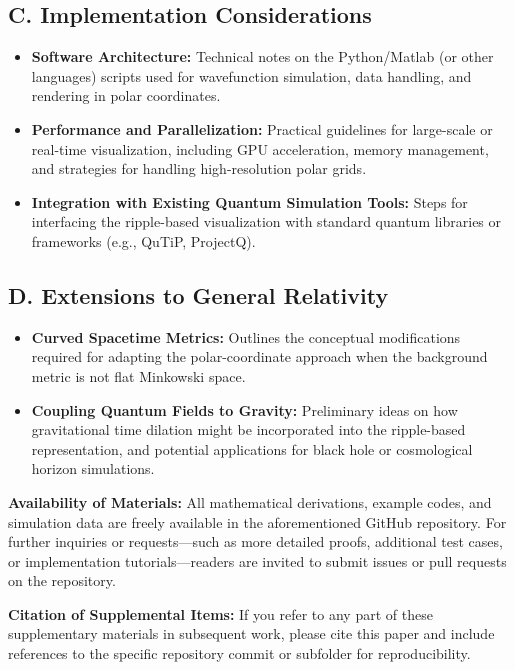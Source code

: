 \documentclass{article}
\begin{document}
\subsection*{C. Implementation Considerations}
\begin{itemize}
    \item \textbf{Software Architecture:}
    Technical notes on the Python/Matlab (or other languages) scripts used for wavefunction simulation, data handling, and rendering in polar coordinates.
    \item \textbf{Performance and Parallelization:}
    Practical guidelines for large-scale or real-time visualization, including GPU acceleration, memory management, and strategies for handling high-resolution polar grids.
    \item \textbf{Integration with Existing Quantum Simulation Tools:}
    Steps for interfacing the ripple-based visualization with standard quantum libraries or frameworks (e.g., QuTiP, ProjectQ). 
\end{itemize}

\subsection*{D. Extensions to General Relativity}
\begin{itemize}
    \item \textbf{Curved Spacetime Metrics:}
    Outlines the conceptual modifications required for adapting the polar-coordinate approach when the background metric is not flat Minkowski space. 
    \item \textbf{Coupling Quantum Fields to Gravity:}
    Preliminary ideas on how gravitational time dilation might be incorporated into the ripple-based representation, and potential applications for black hole or cosmological horizon simulations.
\end{itemize}

\bigskip

\noindent
\textbf{Availability of Materials:}  
All mathematical derivations, example codes, and simulation data are freely available in the aforementioned GitHub repository. For further inquiries or requests—such as more detailed proofs, additional test cases, or implementation tutorials—readers are invited to submit issues or pull requests on the repository.

\medskip

\noindent
\textbf{Citation of Supplemental Items:}  
If you refer to any part of these supplementary materials in subsequent work, please cite this paper and include references to the specific repository commit or subfolder for reproducibility.
\end{document}
